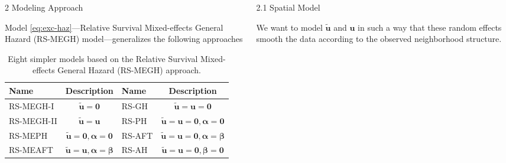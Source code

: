 \documentclass[12pt]{beamer}
\begin{document}
\begin{frame}[t]
\begin{columns}[t]
\begin{column}{0.30\textwidth}
\begin{block}{\Large 2 Modeling Approach}
				\vspace{12pt}
				
				Model \ref{eq:exc-haz}---Relative Survival Mixed-effects General Hazard (RS-MEGH) model---generalizes the following approaches
				
				\begin{table}[]
					\caption{\justifying Eight simpler models based on the Relative Survival Mixed-effects General Hazard (RS-MEGH) approach.}
					\label{tab:models}
					\begin{tabular}{l | c | l | c }
						Name & Description & Name & Description  \\ \hline 
						RS-MEGH-I &  $\tilde{\mathbf{u}} = \mathbf{0}$& RS-GH & $\tilde{\mathbf{u}} = \mathbf{u} = \mathbf{0}$ \\
						RS-MEGH-II &  $\tilde{\mathbf{u}} = \mathbf{u}$& RS-PH & $\tilde{\mathbf{u}} = \mathbf{u} = \mathbf{0}, \boldsymbol{\alpha} = \mathbf{0}$ \\
						RS-MEPH &  $\tilde{\mathbf{u}} = \mathbf{0}, \boldsymbol{\alpha} = \mathbf{0}$& RS-AFT & $\tilde{\mathbf{u}} = \mathbf{u} = \mathbf{0}, \boldsymbol{\alpha} = \boldsymbol{\beta}$ \\
						RS-MEAFT &  $\tilde{\mathbf{u}} = \mathbf{u}, \boldsymbol{\alpha} = \boldsymbol{\beta}$& RS-AH&  $\tilde{\mathbf{u}} = \mathbf{u} = \mathbf{0}, \boldsymbol{\beta} = \mathbf{0}$ \\
					\end{tabular}%
				\end{table}
				
				\vspace{18pt}
				
			\end{block}
			
			\end{column}
		
			\begin{column}{0.30\textwidth} \justifying %
			
			{\large \textcolor{title-fg}{2.1 Spatial Model}} \vspace{18pt}
			
			We want to model $\tilde{\mathbf{u}}$ and $\mathbf{u}$ in such a way that these random effects smooth the data according to the observed neighborhood structure. 
			
			\vspace{18pt}
			

\end{column}
\end{columns}
\end{frame}
\end{document}
